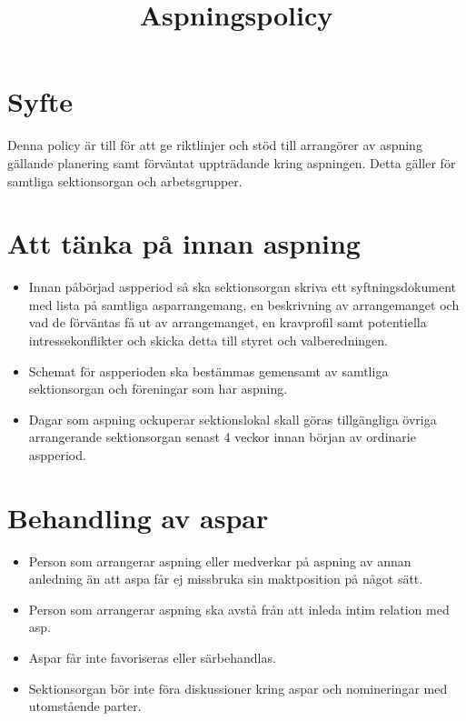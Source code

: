 \documentclass[11pt, includeaddress]{classes/cthit}
\begin{document}
\title{Aspningspolicy}
\maketitle

\thispagestyle{empty}

\newpage

\makeheadfoot%

\setcounter{tocdepth}{2}
\setcounter{page}{1}
\tableofcontents

\newpage

\section{Syfte}
Denna policy är till för att ge riktlinjer och stöd till arrangörer av aspning gällande planering samt förväntat uppträdande kring aspningen. 
Detta gäller för samtliga sektionsorgan och arbetsgrupper.


\section{Att tänka på innan aspning}
\begin{itemize}
  \item Innan påbörjad aspperiod så ska sektionsorgan skriva ett syftningsdokument med lista på samtliga asparrangemang, en beskrivning av arrangemanget och vad de förväntas få ut av arrangemanget, en kravprofil samt potentiella intressekonflikter och skicka detta till styret och valberedningen.
  \item Schemat för aspperioden ska bestämmas gemensamt av samtliga sektionsorgan och föreningar som har aspning.
  \item Dagar som aspning ockuperar sektionslokal skall göras tillgängliga övriga arrangerande sektionsorgan senast 4 veckor innan början av ordinarie aspperiod.
\end{itemize}

\section{Behandling av aspar}
\begin{itemize}
  \item Person som arrangerar aspning eller medverkar på aspning av annan anledning än att aspa får ej missbruka sin maktposition på något sätt.
  \item Person som arrangerar aspning ska avstå från att inleda intim relation med asp.
  \item Aspar får inte favoriseras eller särbehandlas.
  \item Sektionsorgan bör inte föra diskussioner kring aspar och nomineringar med utomstående parter.
\end{itemize}
\end{document}
